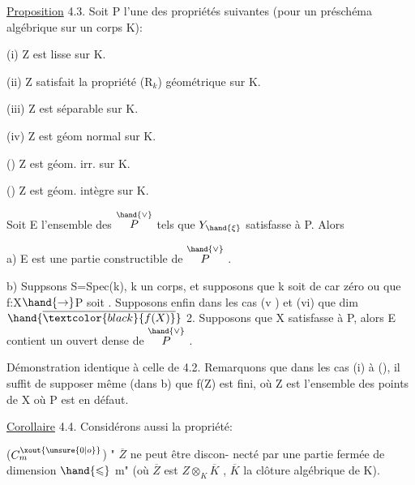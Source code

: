
\uline{Proposition} 4.3.    Soit P l'une des propriétés  suivantes (pour un
préschéma algébrique sur un corps K):

(i)  Z  est lisse sur K.

(ii)  Z satisfait la propriété (R$_k$) géométrique sur K.

(iii)  Z est séparable sur K.

(iv)  Z est géom normal sur K.

\margin{$\uparrow$}()  Z  est géom. irr.  sur K.

()  Z est géom. intègre  sur K.

Soit E l'ensemble des \hand{$\xi \in$} $\overset{\hand{\vee}}{P}$  tels que $Y_{\hand{\xi}}$ satisfasse à P. Alors

a)  E est une partie constructible de $\overset{\hand{\vee}}{P}$ .

b)  Suppsons  S=Spec(k), k un corps, et supposons  que k soit de
car zéro  ou que f:X$\hand{\rightarrow}$P  soit . Supposons enfin dans les
cas (v ) et (vi)  que dim $\hand{\overline{\textcolor{black}{f(X)}}}$ \over{$\hand{>}$}{$\geqslant$} 2.  Supposons que X satisfasse à P,
alors E contient un ouvert  dense de $\overset{\hand{\vee}}{P}$ .

Démonstration identique à celle de 4.2.   Remarquons que dans
les cas (i) à (), il suffit de supposer même (dans b) que  f(Z) est
fini, où Z est l'ensemble des points de X où  P est en défaut.

\uline{Corollaire} 4.4.    Considérons aussi la propriété:

($C_m^{\xout{\unsure{0|o}}}$)   " $\overline{Z}$ ne peut être discon-%
necté par une partie fermée de dimension  $\hand{\leqslant}$ m" (où $\overline{Z}$ est $Z\otimes_K\overline{K}$ , $\overline{K}$
la clôture  algébrique de K).


